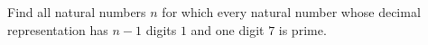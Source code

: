 Find all natural numbers $n$ for which every natural number whose decimal representation has $n-1$ digits $1$ and one digit $7$ is prime.
